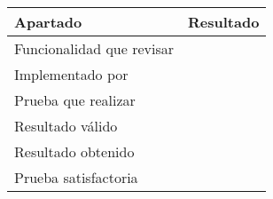 \begin{center}
    \begin{tabulary}{0.8\textwidth}{L|L}
        \textbf{Apartado} & \textbf{Resultado} \\ \hline
        Funcionalidad que revisar & \hspace{5cm} \\
        Implementado por & \hspace{5cm} \\
        Prueba que realizar & \hspace{5cm} \\
        Resultado válido & \hspace{5cm} \\
        Resultado obtenido & \hspace{5cm} \\
        Prueba satisfactoria & \hspace{5cm} \\
    \end{tabulary} 
\end{center}

\newpage